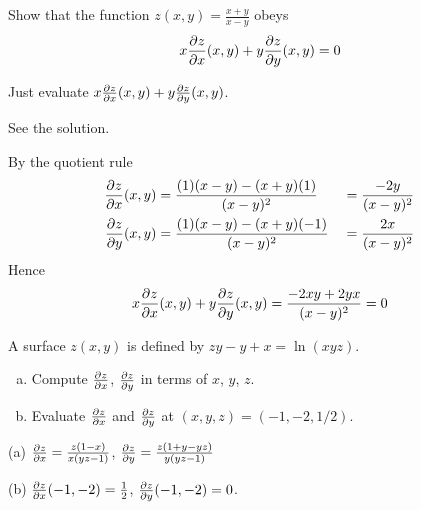 \begin{question}
Show that the function $z(x,y)=\frac{x+y}{x-y}$ obeys
\begin{equation*}
x\pdiff{z}{x}(x,y)+y\pdiff{z}{y}(x,y) = 0
\end{equation*}
\end{question}

\begin{hint}
Just evaluate $x\pdiff{z}{x}(x,y)+y\pdiff{z}{y}(x,y)$.
\end{hint}

\begin{answer}
See the solution.
\end{answer}

\begin{solution}
By the quotient rule
\begin{alignat*}{3}
\pdiff{z}{x}(x,y)
&=\frac{(1)(x-y)-(x+y)(1)}{(x-y)^2}
&&=\frac{-2y}{(x-y)^2}\\
\pdiff{z}{y}(x,y)
&=\frac{(1)(x-y)-(x+y)(-1)}{(x-y)^2}
&&=\frac{2x}{(x-y)^2}
\end{alignat*}
Hence
\begin{equation*}
x\pdiff{z}{x}(x,y)+y\pdiff{z}{y}(x,y) 
=\frac{-2xy+2yx}{(x-y)^2}
=0
\end{equation*}
\end{solution}

\begin{question}[M200 2010A] %
A surface $z(x, y)$ is defined by $zy - y + x = \ln(xyz)$.
\begin{enumerate}[(a)]
\item
Compute $\pdiff{z}{x}$, $\pdiff{z}{y}$ in terms of $x$, $y$, $z$.
\item
Evaluate $\pdiff{z}{x}$ and $\pdiff{z}{y}$ at $(x, y, z) = (-1, -2, 1/2)$.
\end{enumerate}
\end{question}

%

\begin{answer}
(a) 
$\pdiff{z}{x} = \frac{z(1-x)}{x(yz-1)}$,\quad
$\pdiff{z}{y} = \frac{z(1+y-yz)}{y(yz-1)}$

(b) 
$\pdiff{z}{x}(-1,-2) =\frac{1}{2}$,\quad
$\pdiff{z}{y}(-1,-2) =0$.
\end{answer}

